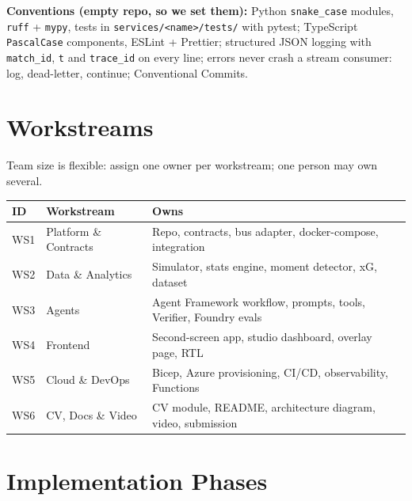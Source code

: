 \documentclass[11pt,a4paper]{article}
\begin{document}
\noindent\textbf{Conventions (empty repo, so we set them):} Python \texttt{snake\_case} modules,
\texttt{ruff} + \texttt{mypy}, tests in \texttt{services/<name>/tests/} with pytest;
TypeScript \texttt{PascalCase} components, ESLint + Prettier; structured JSON logging with
\texttt{match\_id}, \texttt{t} and \texttt{trace\_id} on every line; errors never crash a stream
consumer: log, dead-letter, continue; Conventional Commits.

\section{Workstreams}
Team size is flexible: assign one owner per workstream; one person may own several.

\begin{tabularx}{\linewidth}{@{}l l Y@{}}
\toprule
ID & Workstream & Owns \\
\midrule
WS1 & Platform \& Contracts & Repo, contracts, bus adapter, docker-compose, integration \\
WS2 & Data \& Analytics     & Simulator, stats engine, moment detector, xG, dataset \\
WS3 & Agents                & Agent Framework workflow, prompts, tools, Verifier, Foundry evals \\
WS4 & Frontend              & Second-screen app, studio dashboard, overlay page, RTL \\
WS5 & Cloud \& DevOps       & Bicep, Azure provisioning, CI/CD, observability, Functions \\
WS6 & CV, Docs \& Video     & CV module, README, architecture diagram, video, submission \\
\bottomrule
\end{tabularx}

\section{Implementation Phases}
\end{document}
